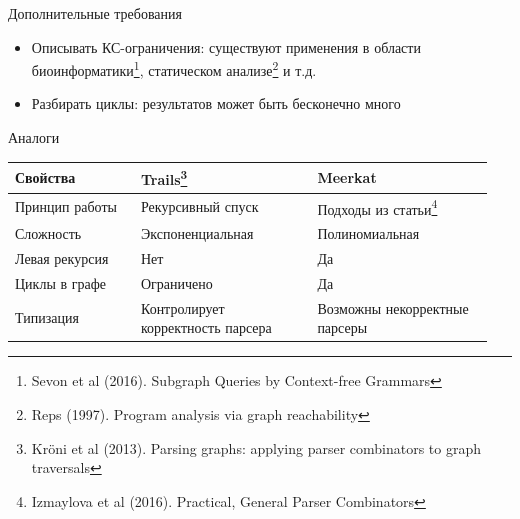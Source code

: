 \documentclass[aspectratio=169]{beamer}
\begin{document}
\begin{frame}[fragile]{Дополнительные требования}
  \begin{itemize}
    \item Описывать КС-ограничения: существуют применения в области биоинформатики\footnote[1]{Sevon et al (2016). Subgraph Queries by Context-free Grammars}, статическом анализе\footnote[2]{Reps (1997). Program analysis via graph reachability} и т.д.
    \item Разбирать циклы: результатов может быть бесконечно много
  \end{itemize}
  \begin{center}
  \end{center}
\end{frame}

\begin{frame}{Аналоги}
  \begin{table}[h]
    \renewcommand{\arraystretch}{1.3}
    \begin{tabular}{|b{0.25\linewidth}|b{0.35\linewidth}|b{0.35\linewidth}|}
      \hline
      \textbf{Свойства} & \textbf{Trails\footnote[1]{Kr\"{o}ni et al (2013). Parsing graphs: applying parser combinators to graph traversals}} & \textbf{Meerkat} \\
      \hline
      Принцип работы & Рекурсивный спуск                 & Подходы из статьи\footnote[2]{Izmaylova et al (2016). Practical, General Parser Combinators} \\
      \hline
      Сложность      & Экспоненциальная                  & Полиномиальная \\
      \hline
      Левая рекурсия & Нет                               & Да \\
      \hline
      Циклы в графе  & Ограничено                        & Да \\
      \hline
      Типизация      & Контролирует корректность парсера & Возможны некорректные парсеры \\
      \hline
    \end{tabular}
  \end{table}
\end{frame}
\end{document}
